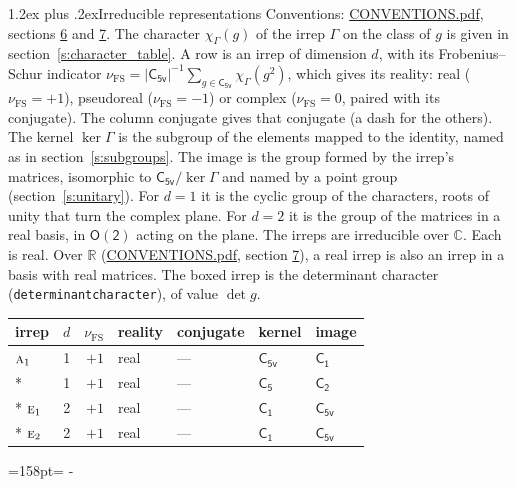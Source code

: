 \documentclass[10pt,a4paper]{article}
\makeatletter
\renewcommand\section{\@startsection{section}{1}{\z@}{-3ex plus -1ex minus -.2ex}%
  {1.2ex plus .2ex}{\normalfont\large\sffamily\bfseries\color{parttitle}}}
\newcommand{\needspace}[1]{\par\penalty-100\begingroup\dimen0=#1\relax\dimen2=\pagegoal
  \advance\dimen2-\pagetotal\ifdim\dimen0>\dimen2\relax\ifdim\dimen2>0pt\vfil\break\fi\fi
  \endgroup}
\numberwithin{equation}{section}
\newcommand{\grp}[1]{\mathsf{#1}}
\newcommand{\irr}[1]{\text{\normalfont\scshape #1}}
\newcommand{\detbox}[1]{{\setlength{\fboxsep}{1pt}\fbox{#1}}}
\newcommand{\irchar}[1]{\chi_{#1}}
\newcommand{\fsind}{\nu_{\mathrm{FS}}}
\makeatother
\begin{document}
\section{Irreducible representations}\label{s:irreps}
Conventions: \href{../../CONVENTIONS.pdf}{CONVENTIONS.pdf}, sections \href{../../CONVENTIONS.pdf\#conv.6}{6} and \href{../../CONVENTIONS.pdf\#conv.7}{7}.
\leavevmode\label{n:function.character}\label{n:irrep.Gamma}The character $\irchar{\Gamma}(g)$ of the irrep $\Gamma$ on the class of $g$ is given in section~\ref{s:character_table}.
\leavevmode\label{n:index.dimension}\label{n:index.frobenius}\label{n:head.irrep}\label{n:head.reality}A row is an irrep of dimension $d$, with its Frobenius--Schur indicator $\fsind = |\grp{C_{5v}}|^{-1}\allowbreak\sum_{g\in\grp{C_{5v}}}\irchar{\Gamma}(g^2)$, which gives its reality: real ($\fsind = +1$), pseudoreal ($\fsind = -1$) or complex ($\fsind = 0$, paired with its conjugate). \label{n:head.conjugate}The column conjugate gives that conjugate (a dash for the others). \label{n:head.kernel}The kernel $\ker\Gamma$ is the subgroup of the elements mapped to the identity, named as in section~\ref{s:subgroups}. \label{n:head.image}The image is the group formed by the irrep's matrices, isomorphic to $\grp{C_{5v}}/\ker\Gamma$ and named by a point group (section~\ref{s:unitary}). For $d = 1$ it is the cyclic group of the characters, roots of unity that turn the complex plane. For $d = 2$ it is the group of the matrices in a real basis, in $\grp{O(2)}$ acting on the plane. The irreps are irreducible over $\mathbb{C}$. Each is real. Over $\mathbb{R}$ (\href{../../CONVENTIONS.pdf}{CONVENTIONS.pdf}, section \href{../../CONVENTIONS.pdf\#conv.7}{7}), a real irrep is also an irrep in a basis with real matrices. \label{n:mark.determinant}The boxed irrep is the determinant character (\texttt{determinantcharacter}), of value $\det g$.
\setlength{\emergencystretch}{2em}\par\setlength{\emergencystretch}{0pt}
{\small\renewcommand{\arraystretch}{1.25}\begin{longtable}{@{}lrrllll@{}}\toprule
irrep & $d$ & $\fsind$ & reality & conjugate & kernel & image\\\midrule\endhead
\bottomrule\endfoot\endlastfoot
$\irr{a}_{1}$ & 1 & $+1$ & real & --- & \href{C5v.pdf}{$\grp{C_{5v}}$} & \href{C1.pdf}{$\grp{C_{1}}$}\\*
\detbox{$\irr{a}_{2}$} & 1 & $+1$ & real & --- & \href{C5.pdf}{$\grp{C_{5}}$} & \href{C2.pdf}{$\grp{C_{2}}$}\\*
$\irr{e}_{1}$ & 2 & $+1$ & real & --- & \href{C1.pdf}{$\grp{C_{1}}$} & \href{C5v.pdf}{$\grp{C_{5v}}$}\\*
$\irr{e}_{2}$ & 2 & $+1$ & real & --- & \href{C1.pdf}{$\grp{C_{1}}$} & \href{C5v.pdf}{$\grp{C_{5v}}$}\\
\bottomrule\end{longtable}}
\needspace{158pt}
\end{document}
